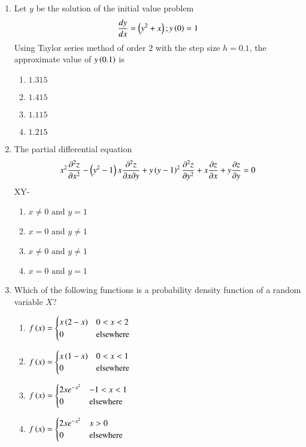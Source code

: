 \documentclass[journal,12pt,onecolumn]{IEEEtran}
\theoremstyle{remark}
\begin{document}
\begin{enumerate}
\item Let $y$ be the solution of the initial value problem
\begin{align*}
\frac{dy}{dx} = \left(y^{2} + x\right); y\left(0\right)=1
\end{align*}
Using Taylor series method of order $2$ with the step size $h=0.1$, the approximate value of $y\left(0.1\right)$ is
\begin{enumerate}
\item $1.315$
\item $1.415$
\item $1.115$
\item $1.215$
\end{enumerate}

\item The partial differential equation
\begin{align*}
x^{2} \frac{\partial^{2}{z}}{\partial{x^2}} - \left(y^2 - 1\right)x\frac{\partial^{2}{z}}{\partial{x}\partial{y}} + y\left(y-1\right)^{2}\frac{\partial^{2}{z}}{\partial{y^2}} + x\frac{\partial{z}}{\partial{x}} + y\frac{\partial{z}}{\partial{y}}=0 
\end{align*}
 XY- 
\begin{enumerate}
\item $x\neq0 \text{ and } y=1$
\item $x=0 \text{ and } y\neq1$
\item $x\neq0 \text{ and } y\neq1$
\item $x=0 \text{ and } y=1$
\end{enumerate}

\item Which of the following functions is a probability density function of a random variable $X$?
\begin{enumerate}
\item $f\left(x\right) =
\begin{cases}
x\left(2-x\right) & 0<x<2 \\ 0 & \text{elsewhere}
\end{cases}$
\item $f\left(x\right) =
\begin{cases}
x\left(1-x\right) & 0<x<1 \\ 0 & \text{elsewhere}
\end{cases}$
\item $f\left(x\right) =
\begin{cases}
2xe^{-x^2} & -1<x<1 \\ 0 & \text{elsewhere}
\end{cases}$
\item $f\left(x\right) =
\begin{cases}
2xe^{-x^2} & x>0 \\ 0 & \text{elsewhere}
\end{cases}$
\end{enumerate}


\end{enumerate}
\end{document}
